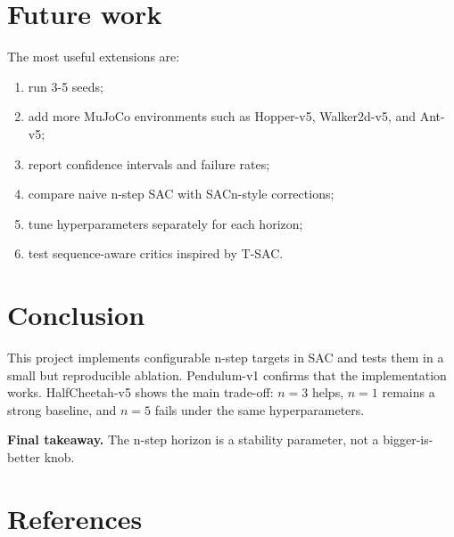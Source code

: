 \documentclass[
  american,
]{article}
\providecommand{\tightlist}{%
  \setlength{\itemsep}{0pt}\setlength{\parskip}{0pt}}
\begin{document}
\section{Future work}\label{future-work}

The most useful extensions are:

\begin{enumerate}
\def\labelenumi{\arabic{enumi}.}
\tightlist
\item
  run 3-5 seeds;
\item
  add more MuJoCo environments such as Hopper-v5, Walker2d-v5, and
  Ant-v5;
\item
  report confidence intervals and failure rates;
\item
  compare naive n-step SAC with SACn-style corrections;
\item
  tune hyperparameters separately for each horizon;
\item
  test sequence-aware critics inspired by T-SAC.
\end{enumerate}

\section{Conclusion}\label{conclusion}

This project implements configurable n-step targets in SAC and tests
them in a small but reproducible ablation. Pendulum-v1 confirms that the
implementation works. HalfCheetah-v5 shows the main trade-off: \(n=3\)
helps, \(n=1\) remains a strong baseline, and \(n=5\) fails under the
same hyperparameters.

\begin{keybox}
\textbf{Final takeaway.} The n-step horizon is a stability parameter, not a bigger-is-better knob.
\end{keybox}

\section*{References}\label{references}
\end{document}
